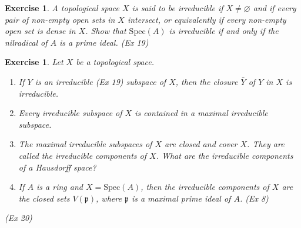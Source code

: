 \documentclass[]{report}
\newtheorem{exercise}[theorem]{Exercise}
\begin{document}
\begin{exercise}
    A topological space $X$ is said to be irreducible if $X \neq \varnothing$ and if every pair of non-empty open sets in $X$ intersect, or equivalently if every non-empty open set is dense in $X$. Show that $\text{Spec}(A)$ is irreducible if and only if the nilradical of $A$ is a prime ideal. 
    (Ex 19)
\end{exercise}

\begin{exercise}
    Let $X$ be a topological space.
    \begin{enumerate}
        \item If $Y$ is an irreducible (Ex 19) subspace of $X$, then the closure $\bar{Y}$ of $Y$ in $X$ is irreducible.
        \item Every irreducible subspace of $X$ is contained in a maximal irreducible subspace. 
        \item The maximal irreducible subspaces of $X$ are closed and cover $X$. They are called the irreducible components of $X$. What are the irreducible components of a Hausdorff space?
        \item If $A$ is a ring and $X = \text{Spec}(A)$, then the irreducible components of $X$ are the closed sets $V(\mathfrak{p})$, where $\mathfrak{p}$ is a maximal prime ideal of $A$. (Ex 8)
    \end{enumerate}
    (Ex 20)
\end{exercise}
\end{document}
